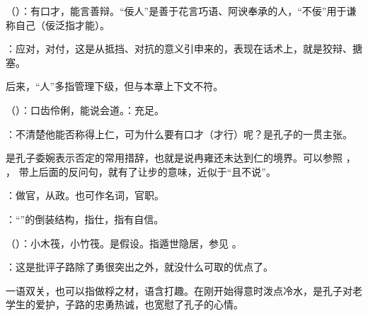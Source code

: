 {
\item {}（）：有口才，能言善辩。“佞人”是善于花言巧语、阿谀奉承的人，“不佞”用于谦称自己（佞泛指才能）。

\item {}：应对，对付，这是从抵挡、对抗的意义引申来的，表现在话术上，就是狡辩、搪塞。

后来，“人”多指管理下级，但与本章上下文不符。

\item {}（）：口齿伶俐，能说会道。：充足。

\item {}：不清楚他能否称得上仁，可为什么要有口才（才行）呢？是孔子的一贯主张。

是孔子委婉表示否定的常用措辞，也就是说冉雍还未达到仁的境界。可以参照  ， ，  带上后面的反问句，就有了让步的意味，近似于“且不说”。
}
{}


{
\item {}：做官，从政。也可作名词，官职。

\item {}：“”的倒装结构，指仕，指有自信。
}
{}


{
\item {}（）：小木筏，小竹筏。是假设。指遁世隐居，参见 。
\item {}：这是批评子路除了勇很突出之外，就没什么可取的优点了。

一语双关，也可以指做桴之材，语含打趣。在刚开始得意时泼点冷水，是孔子对老学生的爱护，子路的忠勇热诚，也宽慰了孔子的心情。
}
{}


